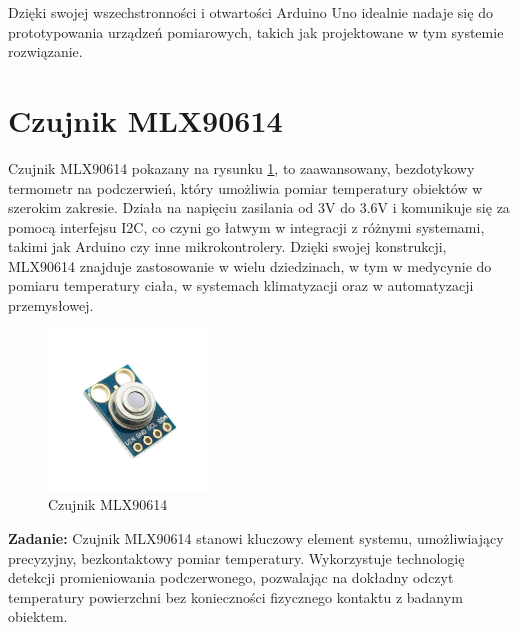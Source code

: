 \newpage

Dzięki swojej wszechstronności i otwartości Arduino Uno idealnie nadaje się do prototypowania urządzeń pomiarowych, takich jak projektowane w tym systemie rozwiązanie.


\vspace{12pt}

\section{Czujnik MLX90614}

    Czujnik MLX90614 pokazany na rysunku \ref{fig:mlx}, to zaawansowany, bezdotykowy termometr na podczerwień, który umożliwia pomiar temperatury obiektów w szerokim zakresie. Działa na napięciu zasilania od 3V do 3.6V i komunikuje się za pomocą interfejsu I2C, co czyni go łatwym w integracji z różnymi systemami, takimi jak Arduino czy inne mikrokontrolery. Dzięki swojej konstrukcji, MLX90614 znajduje zastosowanie w wielu dziedzinach, w tym w medycynie do pomiaru temperatury ciała, w systemach klimatyzacji oraz w automatyzacji przemysłowej.

    \begin{figure}[h!]
        \centering
        \includegraphics[width=0.38\textwidth]{images/mlx.jpg}
        \caption{Czujnik MLX90614 \cite{6}}
        \label{fig:mlx}
    \end{figure}

\textbf{Zadanie:} Czujnik MLX90614 stanowi kluczowy element systemu, umożliwiający precyzyjny, bezkontaktowy pomiar temperatury. Wykorzystuje technologię detekcji promieniowania podczerwonego, pozwalając na dokładny odczyt temperatury powierzchni bez konieczności fizycznego kontaktu z badanym obiektem.

\vspace{12pt}


\vspace{12pt}

